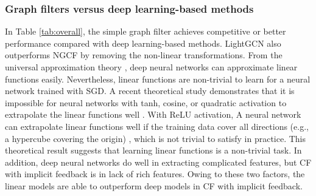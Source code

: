 \documentclass[sigconf]{acmart}
\begin{document}
\subsubsection{Graph filters versus deep learning-based methods} In Table \ref{tab:overall}, the simple graph filter achieves competitive or better performance compared with deep learning-based methods. LightGCN also outperforms NGCF by removing the non-linear transformations. From the universal approximation theory \cite{hornik1989multilayer}, deep neural networks can approximate linear functions easily. Nevertheless, linear functions are non-trivial to learn for a neural network trained with SGD. A recent theoretical study demonstrates that it is impossible for neural networks with tanh, cosine, or quadratic activation to extrapolate the linear functions well \cite{xu2020neural}. With ReLU activation, A neural network can extrapolate linear functions well if the training data cover all directions (e.g., a hypercube covering the origin) \cite{xu2020neural}, which is not trivial to satisfy in practice. This theoretical result suggests that learning linear functions is a non-trivial task. In addition, deep neural networks do well in extracting complicated features, but CF with implicit feedback is in lack of rich features. Owing to these two factors, the linear models are able to outperform deep models in CF with implicit feedback.
\end{document}
